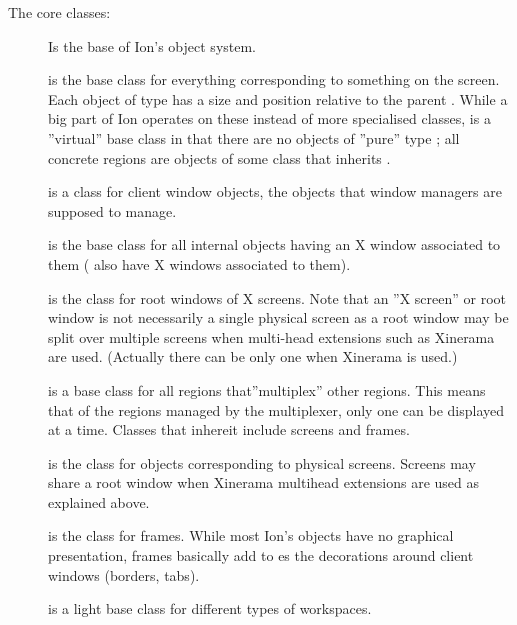 The core classes:

\begin{description}
  \item[]
    Is the base of Ion's object system.

  \item[]
    is the base class for everything corresponding to something on the
    screen. Each object of type  has a size and  position
    relative to the parent . While a big part of Ion 
    operates on these instead of more specialised classes, 
    is a ''virtual''  base class in that there are no objects of ''pure''
    type ; all concrete regions are objects of some class 
    that inherits .

  \item[] is a class for
    client window objects, the objects that window managers are
    supposed to manage.

  \item[] is the base class for all
    internal objects having an X window associated to them
    ( also have X windows associated to them).
    
  \item[] is the class for
    root windows of X screens.
    Note that an ''X screen'' or root window is not necessarily a
    single  physical screen as a root window
    may be split over multiple screens when multi-head extensions 
    such as Xinerama are used. (Actually there
    can be only one  when Xinerama is used.)
	
  \item[] is a base class for all regions that''multiplex'' 
    other regions. This means that of the regions managed by the multiplexer,
    only one can be displayed at a time. Classes that inhereit 
    include screens and frames.
    
  \item[] is the class for objects
    corresponding to physical screens. Screens may share a root
    window when Xinerama multihead extensions are used as explained
    above.

  \item[] is the class for frames.
    While most Ion's objects have no graphical presentation, frames basically
    add to es the decorations around client windows 
    (borders, tabs).

  \item[] is a light base class for
    different types of workspaces.
\end{description}


